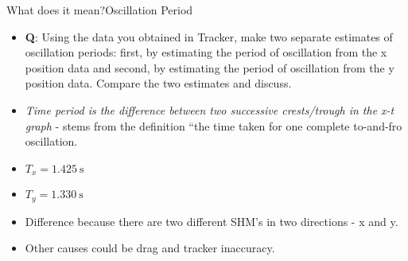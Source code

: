 \begin{frame}{What does it mean?}{Oscillation Period}
\begin{itemize}
    \item \textbf{Q}: Using the data you obtained in Tracker, make two separate estimates of oscillation periods: first, by estimating the period of oscillation from the x position data and second, by estimating the period of oscillation from the y position data. Compare the two estimates and discuss.
    \item \textit{Time period is the difference between two successive crests/trough in the x-t graph} - stems from the definition ``the time taken for one complete to-and-fro oscillation.
    \item \(T_x = 1.425\ \mathrm{s}\)
    \item \(T_y = 1.330\ \mathrm{s}\)
    \item Difference because there are two different SHM's in two directions - x and y.
    \item Other causes could be drag and tracker inaccuracy.
\end{itemize}
\end{frame}
